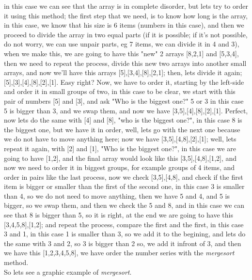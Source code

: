 \documentclass[12pt, letterpaper]{article}
\begin{document}
in this case we can see that the array is in complete disorder, but lets try to order it using this method; the first step that we need, is to know how long is the array, in this case, we know that his size is 6 items (numbers in this case), and then we proceed to divide the array in two equal parts (if it is possible; if it's not possible, do not worry, we can use unpair parts, eg 7 items, we can divide it in 4 and 3), when we make this, we are going to have this "new" 2 arrays [8,2,1] and [5,3,4], then we need to repeat the process, divide this new two arrays into another small arrays, and now we'll have this arrays [5],[3,4],[8],[2,1]; then, lets divide it again; [5],[3],[4],[8],[2],[1]. Easy right? Now, we have to order it, starting by the left-side and order it in small groups of two, in this case to be clear, we start with this pair of numbers [5] and [3], and ask "Who is the biggest one?" 5 or 3 in this case 5 is bigger than 3, and we swap them, and now we have [3,5],[4],[8],[2],[1]. Perfect, now lets do the same with [4] and [8], "who is the biggest one?", in this case 8 is the biggest one, but we have it in order, well, lets go with the next one because we do not have to move anything here; now we have [3,5],[4,8],[2],[1]; well, lets repeat it again, with [2] and [1], "Who is the biggest one?", in this case we are going to have [1,2], and the final array would look like this [3,5],[4,8],[1,2], and now we need to order it in biggest groups, for example groups of 4 items, and order in pairs like the last process, now we check [3,5],[4,8], and check if the first item is bigger or smaller than the first of the second one, in this case 3 is smaller than 4, so we do not need to move anything, then we have 5 and 4, and 5 is bigger, so we swap them, and then we check the 5 and 8, and in this case we can see that 8 is bigger than 5, so it is right, at the end we are going to have this [3,4,5,8],[1,2]; and repeat the process, compare the first and the first, in this case 3 and 1, in this case 1 is smaller than 3, so we add it to the begining, and lets do the same with 3 and 2, so 3 is bigger than 2 so, we add it infront of 3, and then we have this [1,2,3,4,5,8], we have order the number series with the \textit{mergesort} method.
\\
So lets see a graphic example of \textit{mergesort}.
\\
\\
\\
\end{document}
